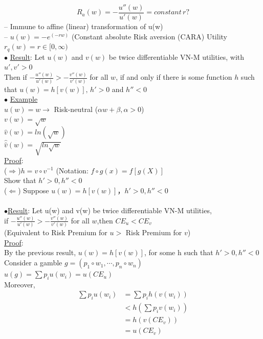 \documentclass[letterpaper,13pt,single,pdftex]{scrartcl}
\begin{document}
\[R_a(w) = -\frac{u''(w)}{u'(w)} = constant \, r?\]
-- Immune to affine (linear) transformation of u(w)\\
-- $u(w) = -e^{(-rw)}$ (Constant absolute Risk aversion (CARA) Utility\\
$r_q(w)  = r\in [0, \infty)$\\
$\bullet$ \underline{Result}: Let $u(w) $ and $v(w)$ be twice differentiable VN-M utilities, with $u',v'>0$\\
Then if $-\frac{u''(w)}{u'(w)} > -\frac{v''(w)}{v'(w)}$ for all $w$, 
if and only if there is some function $h$ such that $ u(w) = h[v(w)],\,h'>0$ and $h''<0$\\
$\bullet$ \underline{Example}\\
$u(w) = w \rightarrow$ Risk-neutral ($\alpha w +\beta , \alpha >0$)\\
$v(w) =\sqrt{w}$\\
$\hat{v}(w) = ln (\sqrt{w})$\\
$\hat{\hat{v}}(w) = \sqrt{ln\sqrt{w}}$\\
\underline{Proof}:\\
($\Rightarrow$)$ h = v \circ v^{-1}$ (Notation: $f \circ g(x) = f [g(X)]$\\
Show that $h'>0, h''<0$\\
($\Leftarrow$) Suppose $u(w) = h[v(w)]，h'>0, h''<0$\\
\\
$\bullet$\underline{Result}: Let u(w) and v(w) be twice differentiable VN-M utilities,\\
if $-\frac{u''(w)}{u'(w)} > -\frac{v''(w)}{v'(w)}$ for all $w$,then $CE_u< CE_v$\\
(Equivalent to Risk Premium for $u>$ Risk Premium for $v$)\\
\underline{Proof}:\\
By the previous result, $u(w) = h[v(w)]$, for some h such that $h'>0,h''<0$\\
Consider a gamble $g = (p_1\circ w_1, \cdots, p_n \circ w_n)$\\
$u(g) = \sum p_i u(w_i) = u(CE_u)$\\
Moreover, 
\begin{align*}
    \sum p_i u(w_i) &= \sum p_i h(v(w_i))\\
                    &< h(\sum p_i v(w_i))\\
                    &= h(v(CE_v))\\
                    &= u(CE_v)\\
\end{align*}
\end{document}
